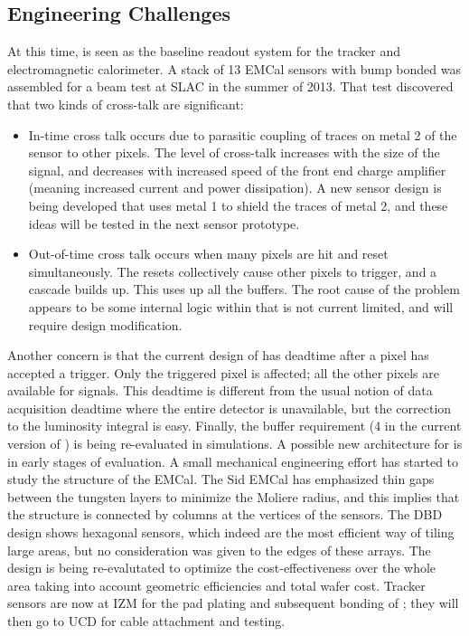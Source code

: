 \subsection{Engineering Challenges}
At this time, \KPIX is seen as the baseline readout system for the tracker and electromagnetic calorimeter. A stack of 13 EMCal sensors with bump bonded \KPIX was assembled for a beam test at SLAC in the summer of 2013. That test discovered that two kinds of cross-talk are significant:
\begin{itemize}
	\item In-time cross talk occurs due to parasitic coupling of traces on metal 2 of the sensor to other pixels. The level of cross-talk increases 
	with the size of the signal, and decreases with increased speed of the front end charge amplifier (meaning increased current and power dissipation).  
	A new sensor design is being developed that uses metal 1 to shield the traces of metal 2, and these ideas will be tested in the next sensor prototype.
	\item Out-of-time cross talk occurs when many pixels are hit and reset simultaneously. The resets collectively cause other pixels to trigger, and a 
	cascade builds up. This uses up all the \KPIX buffers. The root cause of the problem appears to be some internal logic within \KPIX that is not current limited, and will require design modification.
\end{itemize}


Another concern is that the current design of \KPIX has deadtime after a pixel has accepted a trigger. Only the triggered pixel is affected; all the other pixels are available for signals. This deadtime is different from the usual notion of data acquisition deadtime where the entire detector is unavailable, but the correction to the luminosity integral is easy. Finally, the buffer requirement (4 in the current version of \KPIX) is being re-evaluated in \SID simulations. A possible new architecture for \KPIX is in early stages of evaluation.
A small mechanical engineering effort has started to study the structure of the EMCal. The Sid EMCal has emphasized thin gaps between the tungsten layers to minimize the Moliere radius, and this implies that the structure is connected by columns at the vertices of the sensors. The DBD design shows hexagonal sensors, which indeed are the most efficient way of tiling large areas, but no consideration was given to the edges of these arrays. The design is being re-evalutated to optimize the cost-effectiveness over the whole area taking into account geometric efficiencies and total wafer cost.
Tracker sensors are now at IZM for the pad plating and subsequent bonding of \KPIX; they will then go to UCD for cable attachment and testing.


